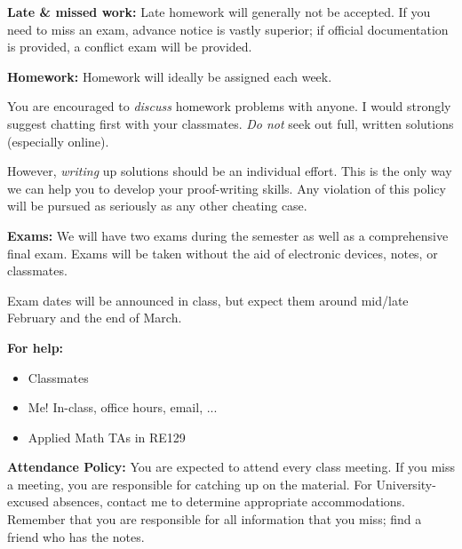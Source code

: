 \documentclass[11pt]{amsart}
\begin{document}
\vspace{10pt}
\noindent \textbf{Late \& missed work:}  Late homework will generally not be accepted.  
If you need to miss an exam, advance notice is vastly superior; if official documentation is provided, a conflict exam will be provided.

\vspace{10pt}
\noindent \textbf{Homework:}  Homework will ideally be assigned each week.

You are encouraged to \textit{discuss} homework problems with anyone.  I would strongly suggest chatting first with your classmates.  \textit{Do not} seek out full, written solutions (especially online).

However, \textit{writing} up solutions should be an individual effort.  This is the only way we can help you to develop your proof-writing skills.  Any violation of this policy will be pursued as seriously as any other cheating case.

\vspace{10pt}
\noindent \textbf{Exams:}  We will have two exams during the semester as well as a comprehensive final exam.  Exams will be taken without the aid of electronic devices, notes, or classmates.

Exam dates will be announced in class, but expect them around mid/late February and the end of March.

\vspace{10pt}
\noindent\textbf{For help:}
\begin{itemize}
\item Classmates
\item Me!  In-class, office hours, email, ...
\item Applied Math TAs in RE129
\end{itemize}

\vspace{10pt}
\noindent\textbf{Attendance Policy:}  You are expected to attend every class meeting.  If you miss a meeting, you are responsible for catching up on the material.  
For University-excused absences, contact me to determine appropriate accommodations.  Remember that you are responsible for all information that you miss; find a friend who has the notes.
\end{document}
